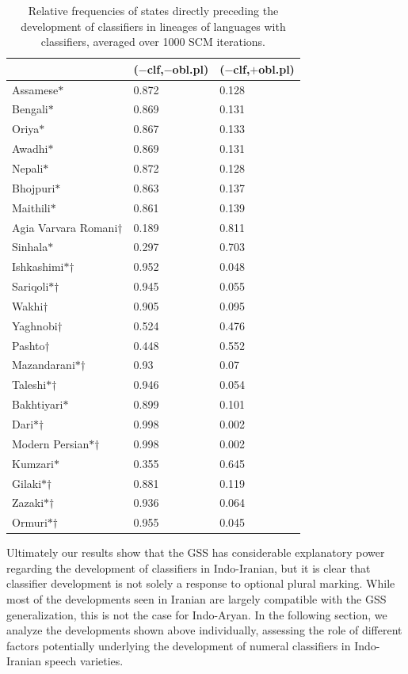 \documentclass[11pt]{article}
\begin{document}
\begin{table}[h!]
\centering
\begin{tabular}{|l|ll|}
\hline
 & ($-$clf,$-$obl.pl) & ($-$clf,$+$obl.pl)\\
\hline
Assamese$*$ & 0.872 & 0.128\\
Bengali$*$ & 0.869 & 0.131\\
Oriya$*$ & 0.867 & 0.133\\
Awadhi$*$ & 0.869 & 0.131\\
Nepali$*$ & 0.872 & 0.128\\
Bhojpuri$*$ & 0.863 & 0.137\\
Maithili$*$ & 0.861 & 0.139\\
Agia Varvara Romani$\dagger$ & 0.189 & 0.811\\
Sinhala$*$ & 0.297 & 0.703\\
\hline
Ishkashimi$*$$\dagger$ & 0.952 & 0.048\\
Sariqoli$*$$\dagger$ & 0.945 & 0.055\\
Wakhi$\dagger$ & 0.905 & 0.095\\
Yaghnobi$\dagger$ & 0.524 & 0.476\\
Pashto$\dagger$ & 0.448 & 0.552\\
Mazandarani$*$$\dagger$ & 0.93 & 0.07\\
Taleshi$*$$\dagger$ & 0.946 & 0.054\\
Bakhtiyari$*$ & 0.899 & 0.101\\
Dari$*$$\dagger$ & 0.998 & 0.002\\
Modern Persian$*$$\dagger$ & 0.998 & 0.002\\
Kumzari$*$ & 0.355 & 0.645\\
Gilaki$*$$\dagger$ & 0.881 & 0.119\\
Zazaki$*$$\dagger$ & 0.936 & 0.064\\
Ormuri$*$$\dagger$ & 0.955 & 0.045\\
\hline
\end{tabular}
\caption{Relative frequencies of states directly preceding the development of classifiers in lineages of languages with classifiers, averaged over 1000 SCM iterations.}
\label{prev_state}
\end{table}

Ultimately our results show that the GSS has considerable explanatory power regarding the development of classifiers in Indo-Iranian, but it is clear that classifier development is not solely a response to optional plural marking. While most of the developments seen in Iranian are largely compatible with the GSS generalization, this is not the case for Indo-Aryan. 
In the following section, we analyze the developments shown above individually, assessing the role of different factors potentially underlying the development of numeral classifiers in Indo-Iranian speech varieties. 
\end{document}
